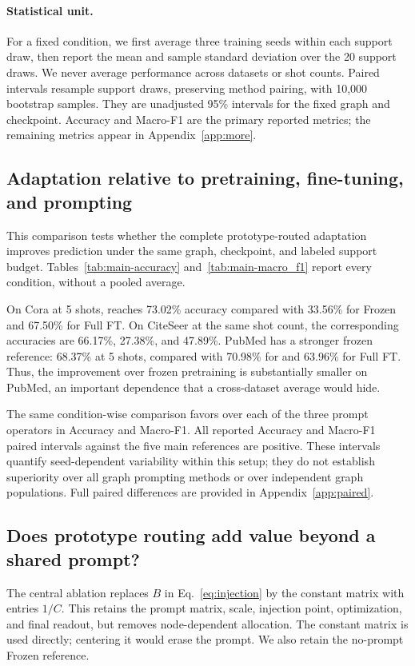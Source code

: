 \paragraph{Statistical unit.}
For a fixed condition, we first average three training seeds within each support draw, then report the mean and sample standard deviation over the 20 support draws. We never average performance across datasets or shot counts. Paired intervals resample support draws, preserving method pairing, with 10,000 bootstrap samples. They are unadjusted 95\% intervals for the fixed graph and checkpoint. Accuracy and Macro-F1 are the primary reported metrics; the remaining metrics appear in Appendix~\ref{app:more}.

\subsection{Adaptation relative to pretraining, fine-tuning, and prompting}
This comparison tests whether the complete prototype-routed adaptation improves prediction under the same graph, checkpoint, and labeled support budget. Tables~\ref{tab:main-accuracy} and~\ref{tab:main-macro_f1} report every condition, without a pooled average.



On Cora at 5 shots, \method{} reaches 73.02\% accuracy compared with 33.56\% for Frozen and 67.50\% for Full FT. On CiteSeer at the same shot count, the corresponding accuracies are 66.17\%, 27.38\%, and 47.89\%. PubMed has a stronger frozen reference: 68.37\% at 5 shots, compared with 70.98\% for \method{} and 63.96\% for Full FT. Thus, the improvement over frozen pretraining is substantially smaller on PubMed, an important dependence that a cross-dataset average would hide.

The same condition-wise comparison favors \method{} over each of the three prompt operators in Accuracy and Macro-F1. All reported Accuracy and Macro-F1 paired intervals against the five main references are positive. These intervals quantify seed-dependent variability within this setup; they do not establish superiority over all graph prompting methods or over independent graph populations. Full paired differences are provided in Appendix~\ref{app:paired}.

\subsection{Does prototype routing add value beyond a shared prompt?}
The central ablation replaces $B$ in Eq.~\eqref{eq:injection} by the constant matrix with entries $1/C$. This retains the prompt matrix, scale, injection point, optimization, and final readout, but removes node-dependent allocation. The constant matrix is used directly; centering it would erase the prompt. We also retain the no-prompt Frozen reference.



